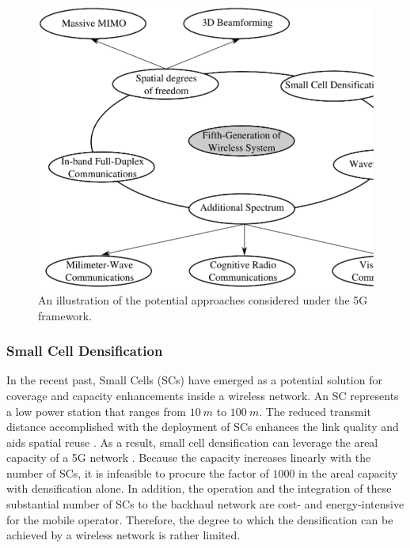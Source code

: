 \begin{figure}[b]
\centering
\includegraphics[width = \figfscale]{figures/5G}
\caption{An illustration of the potential approaches considered under the 5G framework.}
\label{fig_Int:5G}
\end{figure}

\subsubsection*{Small Cell Densification }

In the recent past, Small Cells (SCs) have emerged as a potential solution for coverage and capacity enhancements inside a wireless network. An SC represents a low power station that ranges from $\SI{10}{m}$ to $\SI{100}{m}$. The reduced transmit distance accomplished with the deployment of SCs enhances the link quality and aids spatial reuse \cite{Chander08}.
As a result, small cell densification can leverage the areal capacity of a 5G network \cite{Andrews14}. Because the capacity increases linearly with the number of SCs, it is infeasible to procure the factor of $1000$ in the areal capacity with densification alone. In addition, the operation and the integration of these substantial number of SCs to the backhaul network are cost- and energy-intensive for the mobile operator. Therefore, the degree to which the densification can be achieved by a wireless network is rather limited.

